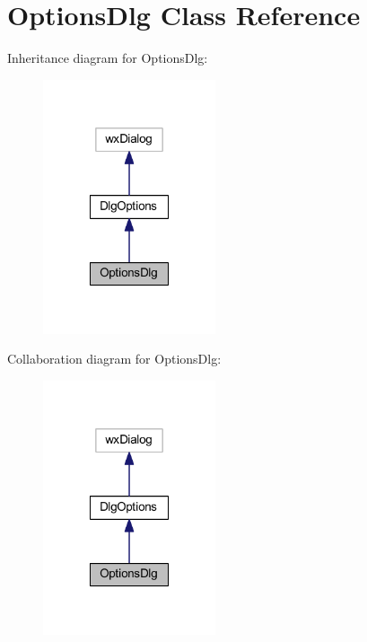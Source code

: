 \hypertarget{class_options_dlg}{\section{Options\-Dlg Class Reference}
\label{class_options_dlg}
}


Inheritance diagram for Options\-Dlg\-:\nopagebreak
\begin{figure}[H]
\begin{center}
\leavevmode
\includegraphics[width=144pt]{class_options_dlg__inherit__graph}
\end{center}
\end{figure}


Collaboration diagram for Options\-Dlg\-:\nopagebreak
\begin{figure}[H]
\begin{center}
\leavevmode
\includegraphics[width=144pt]{class_options_dlg__coll__graph}
\end{center}
\end{figure}
